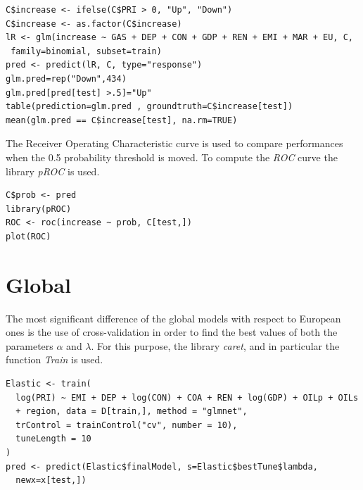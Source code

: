 \documentclass[a4paper,12pt]{book}
\begin{document}
\begin{verbatim}
C$increase <- ifelse(C$PRI > 0, "Up", "Down")
C$increase <- as.factor(C$increase)
lR <- glm(increase ~ GAS + DEP + CON + GDP + REN + EMI + MAR + EU, C,
 family=binomial, subset=train)
pred <- predict(lR, C, type="response")
glm.pred=rep("Down",434)
glm.pred[pred[test] >.5]="Up"
table(prediction=glm.pred , groundtruth=C$increase[test])
mean(glm.pred == C$increase[test], na.rm=TRUE)
\end{verbatim}

The Receiver Operating Characteristic curve is used to compare performances when the 0.5 probability threshold is moved. To compute the \textit{ROC} curve the library \textit{pROC} is used.

\begin{verbatim}
C$prob <- pred
library(pROC)
ROC <- roc(increase ~ prob, C[test,])
plot(ROC)
\end{verbatim}

\section*{Global}

The most significant difference of the global models with respect to European ones is the use of cross-validation in order to find the best values of both the parameters $\alpha$ and $\lambda$. For this purpose, the library \textit{caret}, and in particular the function \textit{Train} is used.

\begin{verbatim}
Elastic <- train(
  log(PRI) ~ EMI + DEP + log(CON) + COA + REN + log(GDP) + OILp + OILs
  + region, data = D[train,], method = "glmnet",
  trControl = trainControl("cv", number = 10),
  tuneLength = 10
)
pred <- predict(Elastic$finalModel, s=Elastic$bestTune$lambda,
  newx=x[test,])
\end{verbatim}

{}

\end{document}
